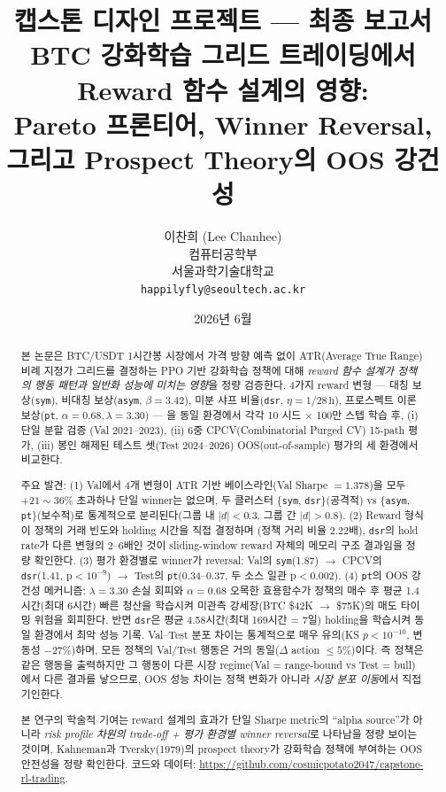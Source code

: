 \documentclass[11pt, a4paper]{article}
\title{
    \vspace{-1cm}
    {\large 캡스톤 디자인 프로젝트 — 최종 보고서}\\[0.8em]
    \textbf{BTC 강화학습 그리드 트레이딩에서 Reward 함수 설계의 영향:\\
    Pareto 프론티어, Winner Reversal,\\
    그리고 Prospect Theory의 OOS 강건성}
}
\author{
    이찬희 (Lee Chanhee)\\
    컴퓨터공학부\\
    서울과학기술대학교\\
    \texttt{happilyfly@seoultech.ac.kr}
}
\date{2026년 6월}
\begin{document}
\maketitle
\thispagestyle{empty}

\begin{abstract}
본 논문은 BTC/USDT 1시간봉 시장에서 가격 방향 예측 없이 ATR(Average True Range) 비례
지정가 그리드를 결정하는 PPO 기반 강화학습 정책에 대해 \emph{reward 함수 설계가 정책의
행동 패턴과 일반화 성능에 미치는 영향}을 정량 검증한다. 4가지 reward 변형 ---
대칭 보상(\texttt{sym}), 비대칭 보상(\texttt{asym}, $\beta=3.42$),
미분 샤프 비율(\texttt{dsr}, $\eta=1/28\,\mathrm{h}$),
프로스펙트 이론 보상(\texttt{pt}, $\alpha=0.68, \lambda=3.30$) --- 을 동일 환경에서
각각 10 시드 $\times$ 100만 스텝 학습 후, (i) 단일 분할 검증 (Val 2021--2023),
(ii) 6중 CPCV(Combinatorial Purged CV) 15-path 평가,
(iii) 봉인 해제된 테스트 셋(Test 2024--2026) OOS(out-of-sample) 평가의 세 환경에서 비교한다.

주요 발견:
(1) Val에서 4개 변형이 ATR 기반 베이스라인(Val Sharpe $= 1.378$)을 모두
$+21\sim36\%$ 초과하나 단일 winner는 없으며, 두 클러스터
\{\texttt{sym}, \texttt{dsr}\}(공격적) vs \{\texttt{asym}, \texttt{pt}\}(보수적)로
통계적으로 분리된다(그룹 내 $|d|<0.3$, 그룹 간 $|d|>0.8$).
(2) Reward 형식이 정책의 거래 빈도와 holding 시간을 직접 결정하며
(정책 거리 비율 2.22배), \texttt{dsr}의 hold rate가 다른 변형의 2--6배인 것이
sliding-window reward 자체의 메모리 구조 결과임을 정량 확인한다.
(3) 평가 환경별로 winner가 reversal: Val의 \texttt{sym}(1.87) $\to$
CPCV의 \texttt{dsr}(1.41, p$<10^{-9}$) $\to$ Test의 \texttt{pt}(0.34--0.37,
두 소스 일관 p$<$0.002).
(4) \texttt{pt}의 OOS 강건성 메커니즘: $\lambda=3.30$ 손실 회피와 $\alpha=0.68$
오목한 효용함수가 정책의 매수 후 평균 1.4시간(최대 6시간) 빠른 청산을 학습시켜
미관측 강세장(BTC \$42K $\to$ \$75K)의 매도 타이밍 위험을 회피한다. 반면 \texttt{dsr}은
평균 4.58시간(최대 169시간 = 7일) holding을 학습시켜 동일 환경에서 최악 성능 기록.
Val--Test 분포 차이는 통계적으로 매우 유의(KS $p<10^{-10}$, 변동성 $-27\%$)하며,
모든 정책의 Val/Test 행동은 거의 동일($\Delta$ action $\leq 5\%$)이다. 즉 정책은
같은 행동을 출력하지만 그 행동이 다른 시장 regime(Val = range-bound vs Test = bull)에서
다른 결과를 낳으므로, OOS 성능 차이는 정책 변화가 아니라 \emph{시장 분포 이동}에서
직접 기인한다.

본 연구의 학술적 기여는 reward 설계의 효과가 단일 Sharpe metric의 ``alpha source''가
아니라 \emph{risk profile 차원의 trade-off + 평가 환경별 winner reversal}로 나타남을
정량 보이는 것이며, Kahneman과 Tversky(1979)의 prospect theory가 강화학습 정책에 부여하는
OOS 안전성을 정량 확인한다. 코드와 데이터:
\url{https://github.com/cosmicpotato2047/capstone-rl-trading}.
\end{abstract}
\end{document}
